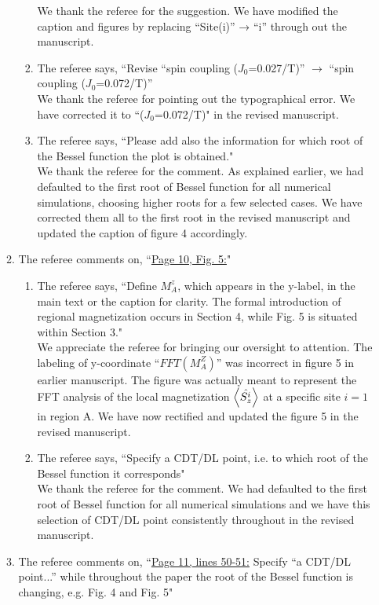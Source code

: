 \documentclass[aps,prb,reprint,showpacs,floatfix,superscriptaddress, onecolumn, nofootinbib, 10pt]{revtex4-2}
\newcommand{\response}[1]{{\color{black}#1}} %
\newcommand{\comment}[1]{{\color{blue}#1}} %
\begin{document}
\begin{enumerate}
\begin{enumerate}
\begin{enumerate}
			\response{We thank the referee for the suggestion. We have modified the caption and figures by replacing ``Site(i)” → ``i” through out the manuscript.}
			\item The referee says, \comment{``Revise “spin coupling ($J_0$=0.027/T)” $\rightarrow$ “spin coupling ($J_0$=0.072/T)”}\\
			
			\response{We thank the referee for pointing out the typographical error. We have corrected it to ``($J_0$=0.072/T)" in the revised manuscript.}\\
			\item The referee says, \comment{``Please add also the information for which root of the Bessel function the plot is obtained."}\\
			
			\response{We thank the referee for the comment. As explained earlier, we had defaulted to the first root of Bessel function for all numerical simulations, choosing higher roots for a few selected cases. We have corrected them all to the first root in the revised manuscript and updated the caption of figure 4 accordingly.}\\
		\end{enumerate}
		\item The referee comments on, \comment{``\underline{Page 10, Fig. 5:}"}
		\begin{enumerate}
			\item The referee says, \comment{``Define $M_A^z$, which appears in the y-label, in the main text or the caption for
			clarity. The formal introduction of regional magnetization occurs in Section 4, while Fig. 5 is situated within Section 3."}\\
			\response{We appreciate the referee for bringing our oversight to attention. The labeling of y-coordinate ``$FFT(M^Z_A)$'' was incorrect in figure 5 in earlier manuscript. The figure was actually meant to represent the FFT analysis of the local magnetization $\expval{\hat{S_z^i}}$ at a specific site $i=1$ in region A. We have now rectified and updated the figure 5 in the revised manuscript.}\\
			
			\item The referee says, \comment{``Specify a CDT/DL point, i.e. to which root of the Bessel function it corresponds"}\\
			
			\response{We thank the referee for the comment. We had defaulted to the first root of Bessel function for all numerical simulations and we have this selection of CDT/DL point consistently throughout in the revised manuscript.}\\
		\end{enumerate}
		\item The referee comments on, \comment{``\underline{Page 11, lines 50-51:} Specify “a CDT/DL point...” while throughout the paper the root of the Bessel function is changing, e.g. Fig. 4 and Fig. 5"}\\
		

\end{enumerate}
\end{enumerate}
\end{document}
